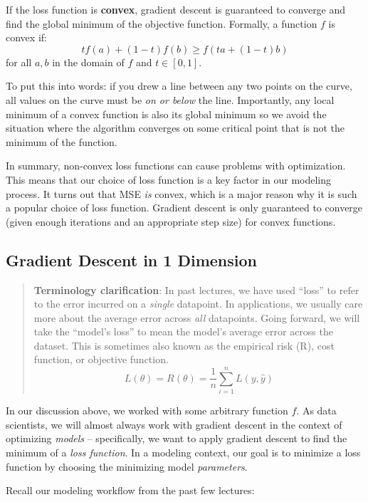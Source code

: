 \documentclass[
  letterpaper,
  DIV=11,
  numbers=noendperiod]{scrreprt}
\begin{document}
If the loss function is \textbf{convex}, gradient descent is guaranteed
to converge and find the global minimum of the objective function.
Formally, a function \(f\) is convex if:
\[tf(a) + (1-t)f(b) \geq f(ta + (1-t)b)\] for all \(a, b\) in the domain
of \(f\) and \(t \in [0, 1]\).

To put this into words: if you drew a line between any two points on the
curve, all values on the curve must be \emph{on or below} the line.
Importantly, any local minimum of a convex function is also its global
minimum so we avoid the situation where the algorithm converges on some
critical point that is not the minimum of the function.

In summary, non-convex loss functions can cause problems with
optimization. This means that our choice of loss function is a key
factor in our modeling process. It turns out that MSE \emph{is} convex,
which is a major reason why it is such a popular choice of loss
function. Gradient descent is only guaranteed to converge (given enough
iterations and an appropriate step size) for convex functions.

\subsection{Gradient Descent in 1
Dimension}\label{gradient-descent-in-1-dimension}

\begin{quote}
\textbf{Terminology clarification}: In past lectures, we have used
``loss'' to refer to the error incurred on a \emph{single} datapoint. In
applications, we usually care more about the average error across
\emph{all} datapoints. Going forward, we will take the ``model's loss''
to mean the model's average error across the dataset. This is sometimes
also known as the empirical risk (R), cost function, or objective
function.
\[L(\theta) = R(\theta) = \frac{1}{n} \sum_{i=1}^{n} L(y, \hat{y})\]
\end{quote}

In our discussion above, we worked with some arbitrary function \(f\).
As data scientists, we will almost always work with gradient descent in
the context of optimizing \emph{models} -- specifically, we want to
apply gradient descent to find the minimum of a \emph{loss function}. In
a modeling context, our goal is to minimize a loss function by choosing
the minimizing model \emph{parameters}.

Recall our modeling workflow from the past few lectures:
\end{document}
